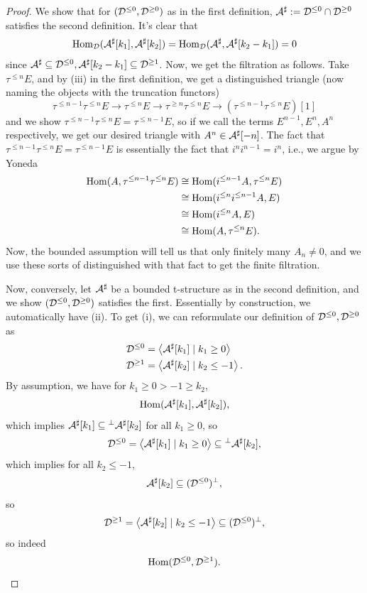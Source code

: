\documentclass[12pt]{article}
\begin{document}
\begin{proof}
    We show that for $(\mathcal{D}^{\leq 0}, \mathcal{D}^{\geq 0})$ as in the first definition, $\mathcal{A}^\sharp := \mathcal{D}^{\leq 0} \cap \mathcal{D}^{\geq 0}$ satisfies the second definition. It's clear that
    \[\mathrm{Hom}_{\mathcal{D}}(\mathcal{A}^\sharp[k_1], \mathcal{A}^\sharp[k_2]) = \mathrm{Hom}_{\mathcal{D}}(\mathcal{A}^\sharp, \mathcal{A}^\sharp[k_2-k_1]) = 0\]
    since $\mathcal{A}^\sharp \subseteq \mathcal{D}^{\leq 0}, \mathcal{A}^\sharp[k_2-k_1] \subseteq \mathcal{D}^{\geq 1}$. Now, we get the filtration as follows. Take $\tau^{\leq n} E$, and by (iii) in the first definition, we get a distinguished triangle (now naming the objects with the truncation functors)
    \[\tau^{\leq n-1} \tau^{\leq n} E \to \tau^{\leq n} E \to \tau^{\geq n} \tau^{\leq n} E \to (\tau^{\leq n-1} \tau^{\leq n} E)[1]\]
    and we show $\tau^{\leq n-1} \tau^{\leq n} E = \tau^{\leq n-1} E$, so if we call the terms $E^{n-1},E^n,A^n$ respectively, we get our desired triangle with $A^n\in \mathcal{A}^\sharp[-n]$. The fact that $\tau^{\leq n-1}\tau^{\leq n} E = \tau^{\leq n-1} E$ is essentially the fact that $i^n i^{n-1} = i^n$, i.e., we argue by Yoneda
    \begin{align*}
        \mathrm{Hom}(A, \tau^{\leq n-1}\tau^{\leq n}E) &\cong \mathrm{Hom}(i^{\leq n-1} A, \tau^{\leq n} E)\\
        &\cong \mathrm{Hom}(i^{\leq n} i^{\leq n-1} A, E)\\
        &\cong \mathrm{Hom}(i^{\leq n} A, E)\\
        &\cong \mathrm{Hom}(A,\tau^{\leq n} E).
    \end{align*}
    Now, the bounded assumption will tell us that only finitely many $A_n \neq 0$, and we use these sorts of distinguished with that fact to get the finite filtration.

    Now, conversely, let $\mathcal{A}^\sharp$ be a bounded t-structure as in the second definition, and we show $(\mathcal{D}^{\leq 0}, \mathcal{D}^{\geq 0})$ satisfies the first. Essentially by construction, we automatically have (ii). To get (i), we can reformulate our definition of $\mathcal{D}^{\leq 0},\mathcal{D}^{\geq 0}$ as
    \begin{align*}
        \mathcal{D}^{\leq 0} &= \left\langle\mathcal{A}^\sharp[k_1] \mid k_1\geq 0\right\rangle\\
        \mathcal{D}^{\geq 1} &= \left\langle\mathcal{A}^\sharp[k_2] \mid k_2\leq -1\right\rangle.
    \end{align*}
    By assumption, we have for $k_1\geq 0 > -1 \geq k_2$,
    \[\mathrm{Hom}(\mathcal{A}^\sharp[k_1], \mathcal{A}^\sharp[k_2]),\]
    which implies $\mathcal{A}^\sharp[k_1] \subseteq {}^\perp \mathcal{A}^\sharp[k_2]$ for all $k_1\geq 0$, so
    \[\mathcal{D}^{\leq 0} = \left\langle\mathcal{A}^\sharp[k_1] \mid k_1\geq 0\right\rangle \subseteq {}^\perp \mathcal{A}^\sharp[k_2],\]
    which implies for all $k_2\leq -1$,
    \[\mathcal{A}^\sharp[k_2] \subseteq (\mathcal{D}^{\leq 0})^\perp,\]
    so
    \[\mathcal{D}^{\geq 1} = \left\langle\mathcal{A}^\sharp[k_2] \mid k_2 \leq -1\right\rangle \subseteq (\mathcal{D}^{\leq 0})^\perp,\]
    so indeed
    \[\mathrm{Hom}(\mathcal{D}^{\leq 0}, \mathcal{D}^{\geq 1}).\]
    

\end{proof}
\end{document}
